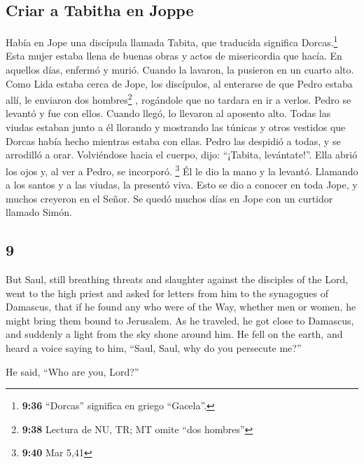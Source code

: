 \begin{paracol}{2}
\hypertarget{criar-a-tabitha-en-joppe}{%
\subsection{Criar a Tabitha en Joppe}\label{criar-a-tabitha-en-joppe}}

 Había en Jope una discípula llamada Tabita, que
traducida significa Dorcas.\footnote{\textbf{9:36} ``Dorcas'' significa
  en griego ``Gacela''.} Esta mujer estaba llena de buenas obras y actos
de misericordia que hacía.  En aquellos días, enfermó y
murió. Cuando la lavaron, la pusieron en un cuarto alto. 
Como Lida estaba cerca de Jope, los discípulos, al enterarse de que
Pedro estaba allí, le enviaron dos hombres\footnote{\textbf{9:38}
  Lectura de NU, TR; MT omite ``dos hombres''} , rogándole que no
tardara en ir a verlos.  Pedro se levantó y fue con
ellos. Cuando llegó, lo llevaron al aposento alto. Todas las viudas
estaban junto a él llorando y mostrando las túnicas y otros vestidos que
Dorcas había hecho mientras estaba con ellas.  Pedro las
despidió a todas, y se arrodilló a orar. Volviéndose hacia el cuerpo,
dijo: ``¡Tabita, levántate!''. Ella abrió los ojos y, al ver a Pedro, se
incorporó. \footnote{\textbf{9:40} Mar 5,41}  Él le dio
la mano y la levantó. Llamando a los santos y a las viudas, la presentó
viva.  Esto se dio a conocer en toda Jope, y muchos
creyeron en el Señor.  Se quedó muchos días en Jope con
un curtidor llamado Simón.

\switchcolumn
\begin{otherlanguage}{english}

\hypertarget{section-17}{%
\section{9}\label{section-17}}

 But Saul, still breathing threats and slaughter against
the disciples of the Lord, went to the high priest  and
asked for letters from him to the synagogues of Damascus, that if he
found any who were of the Way, whether men or women, he might bring them
bound to Jerusalem.  As he traveled, he got close to
Damascus, and suddenly a light from the sky shone around him.
 He fell on the earth, and heard a voice saying to him,
``Saul, Saul, why do you persecute me?''

 He said, ``Who are you, Lord?''


\end{otherlanguage}
\end{paracol}
